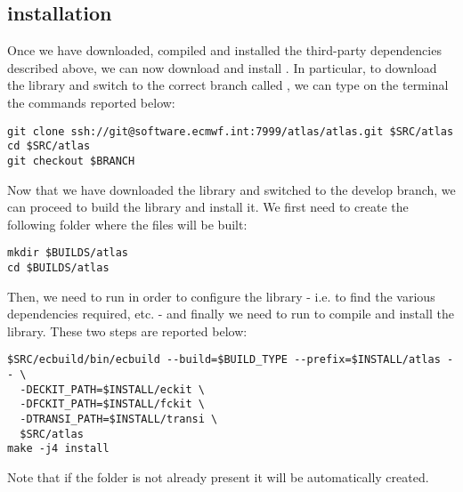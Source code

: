 \subsection{\Atlas installation}
Once we have downloaded, compiled and installed the third-party 
dependencies described above, we can now download and install 
\Atlas. In particular, to download the library and switch 
to the correct branch called , we can type 
on the terminal the commands reported below:
%
\begin{lstlisting}[style=BashStyle]
git clone ssh://git@software.ecmwf.int:7999/atlas/atlas.git $SRC/atlas
cd $SRC/atlas
git checkout $BRANCH
\end{lstlisting}
%
Now that we have downloaded the library and switched 
to the develop branch, we can proceed to build the 
library and install it. We first need to create the 
following folder where the files will be built:
%
\begin{lstlisting}[style=BashStyle]
mkdir $BUILDS/atlas
cd $BUILDS/atlas
\end{lstlisting}
%
Then, we need to run  in order to configure 
the library - i.e. to find the various dependencies required, 
etc. - and finally we need to run  
to compile and install the library. These two steps are 
reported below:
%
\begin{lstlisting}[style=BashStyle]
$SRC/ecbuild/bin/ecbuild --build=$BUILD_TYPE --prefix=$INSTALL/atlas -- \
  -DECKIT_PATH=$INSTALL/eckit \
  -DFCKIT_PATH=$INSTALL/fckit \
  -DTRANSI_PATH=$INSTALL/transi \
  $SRC/atlas
make -j4 install
\end{lstlisting}
%
Note that if the folder  is not already 
present it will be automatically created.

